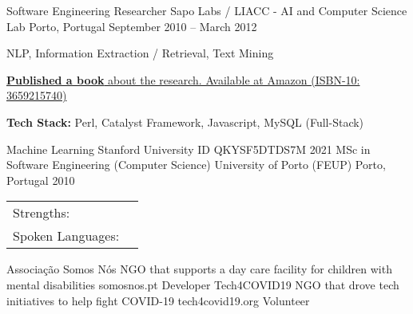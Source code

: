 \documentclass[]{awesome-cv}
\begin{document}
\begin{cventries}
	\vspace{-4mm}
	\cventry
	{Software Engineering Researcher}
	{Sapo Labs / LIACC - AI and Computer Science Lab}
	{Porto, Portugal}
	{September 2010 – March 2012}
	{\begin{cvitems}
		\item {NLP, Information Extraction / Retrieval, Text Mining}
		\item {\href{https://www.amazon.com/Automatic-Extraction-of-Biographical-Data/dp/3659215740}{\textbf{Published a book} about the research. Available at Amazon (ISBN-10: 3659215740)}}
		\item {\textbf{Tech Stack:} Perl, Catalyst Framework, Javascript, MySQL (Full-Stack)}
		\end{cvitems}}
\end{cventries}
\vspace{-5mm}

\vspace{-3mm}
\begin{cvhonors}
	\cvhonor
	{Machine Learning}
	{Stanford University}
	{ID QKYSF5DTDS7M}
	{2021}
	\cvhonor
	{MSc in Software Engineering (Computer Science)}
	{University of Porto (FEUP)}
	{Porto, Portugal}
	{2010}
\end{cvhonors}

\vspace{-3mm}
\begin{cventries}
	\vspace{-2mm}
	\cventry
	{}
	{\def\arraystretch{1.15}{\begin{tabular}{ l l }
		Strengths:  & {\skill{ Leadership, Coaching, Self-Motivation, Problem Solver, Outside-the-box Thinking, Builder, Empowering \& Motivating others }} \\
		Spoken Languages:  & {\skill{ English, Portuguese, French, Spanish, Slovene}} \\
		\end{tabular}}}
	{}
	{}
	{}
\end{cventries}

\vspace{-11mm}

\vspace{-3mm}

\begin{cvhonors}
	\cvhonor
	{Associação Somos Nós}
	{NGO that supports a day care facility for children with mental disabilities}
	{somosnos.pt}
	{Developer}
	\cvhonor
	{Tech4COVID19}
	{NGO that drove tech initiatives to help fight COVID-19}
	{tech4covid19.org}
	{Volunteer}
\end{cvhonors}
\
\end{document}
